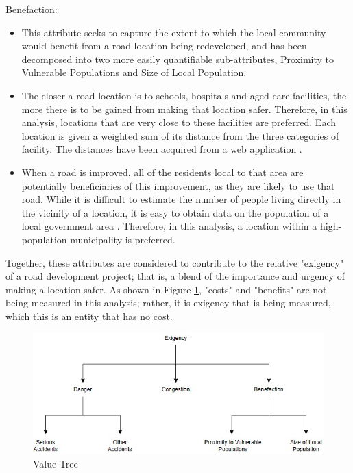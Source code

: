 \documentclass[11pt, a4paper]{article}
\begin{document}
    \hfill \break
    Benefaction:
    \begin{itemize}
        \item This attribute seeks to capture the extent to which the local community would benefit from a road location being redeveloped, and has been decomposed into two more easily quantifiable sub-attributes, Proximity to Vulnerable Populations and Size of Local Population.
        \item The closer a road location is to schools, hospitals and aged care facilities, the more there is to be gained from making that location safer. Therefore, in this analysis, locations that are very close to these facilities are preferred. Each location is given a weighted sum of its distance from the three categories of facility. The distances have been acquired from a web application \parencite{a17}.
        \item When a road is improved, all of the residents local to that area are potentially beneficiaries of this improvement, as they are likely to use that road. While it is difficult to estimate the number of people living directly in the vicinity of a location, it is easy to obtain data on the population of a local government area \parencite{a18}. Therefore, in this analysis, a location within a high-population municipality is preferred.
    \end{itemize}

    Together, these attributes are considered to contribute to the relative "exigency" of a road development project; that is, a blend of the importance and urgency of making a location safer. As shown in Figure \ref{f3}, "costs" and "benefits" are not being measured in this analysis; rather, it is exigency that is being measured, which this is an entity that has no cost.

    \begin{figure}[hbt!]
        \centering
        \includegraphics[width=\textwidth]{figures/3.jpg}
        \caption{Value Tree}
        \label{f3}
    \end{figure}
\end{document}

